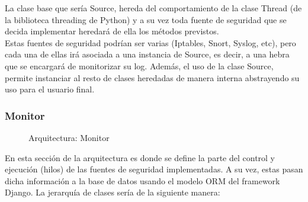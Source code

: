 La clase base que sería Source, hereda del comportamiento de la clase Thread (de la biblioteca threading de Python) y a su vez toda fuente de seguridad que se decida implementar heredará de ella los métodos previstos.\\

Estas fuentes de seguridad podrían ser varias (Iptables, Snort, Syslog, etc), pero cada una de ellas irá asociada a una instancia de Source, es decir, a una hebra que se encargará de monitorizar su log. Además, el uso de la clase Source, permite instanciar al resto de clases heredadas de manera interna abstrayendo su uso para el usuario final.
\newpage

\subsubsection{Monitor}

\begin{figure}[H]
  \caption{Arquitectura: Monitor}
\end{figure}

En esta sección de la arquitectura es donde se define la parte del control y ejecución (hilos) de las fuentes de seguridad implementadas. A su vez, estas pasan dicha información a la base de datos usando el modelo ORM del framework Django. La jerarquía de clases sería de la siguiente manera: \\

